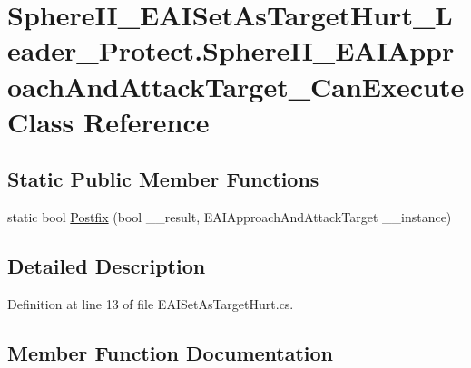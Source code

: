 \hypertarget{class_sphere_i_i___e_a_i_set_as_target_hurt___leader___protect_1_1_sphere_i_i___e_a_i_approach_and_attack_target___can_execute}{}\section{Sphere\+I\+I\+\_\+\+E\+A\+I\+Set\+As\+Target\+Hurt\+\_\+\+Leader\+\_\+\+Protect.\+Sphere\+I\+I\+\_\+\+E\+A\+I\+Approach\+And\+Attack\+Target\+\_\+\+Can\+Execute Class Reference}
\label{class_sphere_i_i___e_a_i_set_as_target_hurt___leader___protect_1_1_sphere_i_i___e_a_i_approach_and_attack_target___can_execute}
\subsection*{Static Public Member Functions}
\begin{DoxyCompactItemize}
\item 
static bool \mbox{\hyperlink{class_sphere_i_i___e_a_i_set_as_target_hurt___leader___protect_1_1_sphere_i_i___e_a_i_approach_and_attack_target___can_execute_aee20847d57d99f42aaaeeda12de15d36}{Postfix}} (bool \+\_\+\+\_\+result, E\+A\+I\+Approach\+And\+Attack\+Target \+\_\+\+\_\+instance)
\end{DoxyCompactItemize}


\subsection{Detailed Description}


Definition at line 13 of file E\+A\+I\+Set\+As\+Target\+Hurt.\+cs.



\subsection{Member Function Documentation}
\mbox{\label{class_sphere_i_i___e_a_i_set_as_target_hurt___leader___protect_1_1_sphere_i_i___e_a_i_approach_and_attack_target___can_execute_aee20847d57d99f42aaaeeda12de15d36}} 
